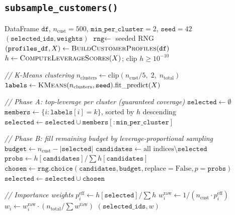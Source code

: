 \documentclass[11pt,a4paper]{article}
\begin{document}
\subsection{\texttt{subsample\_customers()}}

\begin{algorithm}[H]
\caption{\textsc{SubsampleCustomers}}\label{alg:subsample}
\begin{algorithmic}[1]
\Require DataFrame $\texttt{df}$, $n_{\text{cust}}=500$, $\texttt{min\_per\_cluster}=2$, $\texttt{seed}=42$
\Ensure $(\texttt{selected\_ids}, \texttt{weights})$
\State $\texttt{rng} \gets$ seeded RNG
\State $(\texttt{profiles\_df}, X) \gets \Call{BuildCustomerProfiles}{\texttt{df}}$
\State $h \gets \Call{ComputeLeverageScores}{X}$; clip $h \ge 10^{-10}$

\Statex \textit{// K-Means clustering}
\State $n_{\text{clusters}} \gets \text{clip}(n_{\text{cust}} / 5, \; 2, \; n_{\text{total}})$
\State $\texttt{labels} \gets \Call{KMeans}{n_{\text{clusters}}, \texttt{seed}}.\text{fit\_predict}(X)$

\Statex \textit{// Phase A: top-leverage per cluster (guaranteed coverage)}
\State $\texttt{selected} \gets \emptyset$
    \State $\texttt{members} \gets \{i : \texttt{labels}[i] = k\}$, sorted by $h$ descending
    \State $\texttt{selected} \gets \texttt{selected} \cup \texttt{members}[:\texttt{min\_per\_cluster}]$
\EndFor

\Statex \textit{// Phase B: fill remaining budget by leverage-proportional sampling}
\State $\texttt{budget} \gets n_{\text{cust}} - |\texttt{selected}|$
    \State $\texttt{candidates} \gets \text{all indices} \setminus \texttt{selected}$
    \State $\texttt{probs} \gets h[\texttt{candidates}] / \sum h[\texttt{candidates}]$
    \State $\texttt{chosen} \gets \texttt{rng.choice}(\texttt{candidates}, \texttt{budget}, \text{replace}=\text{False}, p=\texttt{probs})$
    \State $\texttt{selected} \gets \texttt{selected} \cup \texttt{chosen}$
\EndIf

\Statex \textit{// Importance weights}
\State $p_i^{\text{eff}} \gets h[\texttt{selected}] / \sum h$
\State $w_i^{\text{raw}} \gets 1 / (n_{\text{cust}} \cdot p_i^{\text{eff}})$
\State $w_i \gets w_i^{\text{raw}} \cdot (n_{\text{total}} / \sum w^{\text{raw}})$ 
\State \Return $(\texttt{selected\_ids}, w)$
\end{algorithmic}
\end{algorithm}
\end{document}
